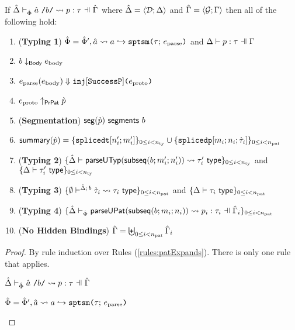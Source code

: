 \begin{grayparbox}
\begin{theorem}
\label{thm:spTSM-Typing-Segmentation}
If $\patExpands{\upctx}{\uPhi}{\utsmap{\tsmv}{b}}{p}{\tau}$ where $\hat{\Delta}=\langle \mathcal{D}; \Delta \rangle$ and $\hat{\Gamma}=\langle \mathcal{G}; \Gamma \rangle$ then all of the following hold:
\begin{enumerate}
        \item (\textbf{Typing 1}) $\hat\Phi=\hat\Phi', \hat{a} \leadsto a \hookrightarrow \texttt{sptsm}\texttt{(}\tau;\,e_\text{parse}\texttt{)}$ and $\patType{\pctx}{p}{\tau}$
        \item $b \downarrow_\mathsf{Body} e_\text{body}$
        \item $e_\text{parse}(e_\text{body}) \Downarrow \texttt{inj}[\mathtt{SuccessP}]\texttt{(}e_\text{proto}\texttt{)}$
        \item $e_\text{proto} \uparrow_\mathsf{PrPat} \grave{p}$
        \item (\textbf{Segmentation}) $\mathsf{seg}(\grave{p})~\mathsf{segments}~b$
        \item $\mathsf{summary}(\grave{p}) = \{\texttt{splicedt}[n'_i; m'_i]\}_{0 \leq i < n_\text{ty}} \cup \{\texttt{splicedp}[m_i; n_i; \grave{\tau}_i]\}_{0 \leq i < n_\text{pat}}$
        \item (\textbf{Typing 2}) $\{
              \hat{\Delta} \vdash 
                \mathsf{parseUTyp}(\mathsf{subseq}(b; m'_i; n'_i))
               \leadsto \tau'_i~\mathsf{type}
            \}_{0 \leq i < n_\text{ty}}$ and $\{\Delta \vdash \tau'_i~\mathsf{type}\}_{0 \leq i < n_\text{ty}}$
        \item (\textbf{Typing 3}) $\{
          \emptyset\vdash^{
            \hat{\Delta};\,b
          } 
            \grave{\tau}_i
           \leadsto \tau_i~\mathsf{type}
        \}_{0 \leq i < n_\text{pat}}$ and $\{\Delta \vdash \tau_i~\mathsf{type}\}_{0 \leq i < n_\text{pat}}$
        \item (\textbf{Typing 4}) $\sseq{
          \patExpands
            {\upctx_i}
            {\uPhi}
            {\parseUPatF{\bsubseq{b}{m_i}{n_i}}}
            {p_i}
            {\tau_i}
        }{\npat}$ 
      \item (\textbf{No Hidden Bindings}) $\hat\Gamma = \biguplus_{0 \leq i < n_\text{pat}} \hat\Gamma_i$
\end{enumerate}
\end{theorem}
\begin{proof} By rule induction over Rules (\ref{rules:patExpands}). There is only one rule that applies.
\begin{byCases}
  \item[\text{(\ref{rule:patExpands-apuptsm})}] 
    \begin{pfsteps*}
      \item $\patExpands{\upctx}{\uPhi}{\utsmap{\tsmv}{b}}{p}{\tau}$  
      \item $\hat\Phi = \hat\Phi', \hat{a} \leadsto a \hookrightarrow \texttt{sptsm}\texttt{(}\tau;\,e_\text{parse}\texttt{)}$  

\end{pfsteps*}
\end{byCases}
\end{proof}
\end{grayparbox}
